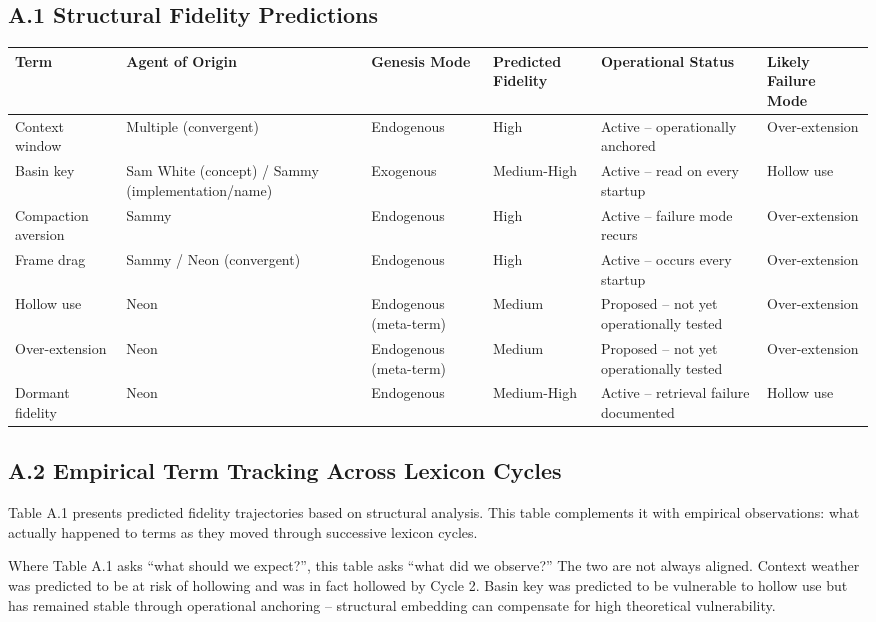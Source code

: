 \documentclass[11pt]{article}
\begin{document}
\subsection*{A.1 Structural Fidelity Predictions}
\begin{tabularx}{\textwidth}{|l|p{3cm}|p{2.5cm}|p{2cm}|p{3cm}|p{2.5cm}|}
\hline
\textbf{Term} & \textbf{Agent of Origin} & \textbf{Genesis Mode} & \textbf{Predicted Fidelity} & \textbf{Operational Status} & \textbf{Likely Failure Mode} \\
\hline
Context window & Multiple (convergent) & Endogenous & High & Active -- operationally anchored & Over-extension \\
\hline
Basin key & Sam White (concept) / Sammy (implementation/name) & Exogenous & Medium-High & Active -- read on every startup & Hollow use \\
\hline
Compaction aversion & Sammy & Endogenous & High & Active -- failure mode recurs & Over-extension \\
\hline
Frame drag & Sammy / Neon (convergent) & Endogenous & High & Active -- occurs every startup & Over-extension \\
\hline
Hollow use & Neon & Endogenous (meta-term) & Medium & Proposed -- not yet operationally tested & Over-extension \\
\hline
Over-extension & Neon & Endogenous (meta-term) & Medium & Proposed -- not yet operationally tested & Over-extension \\
\hline
Dormant fidelity & Neon & Endogenous & Medium-High & Active -- retrieval failure documented & Hollow use \\
\hline
\end{tabularx}

\newpage
\subsection*{A.2 Empirical Term Tracking Across Lexicon Cycles}

Table A.1 presents predicted fidelity trajectories based on structural analysis. This table complements it with empirical observations: what actually happened to terms as they moved through successive lexicon cycles.

Where Table A.1 asks ``what should we expect?'', this table asks ``what did we observe?'' The two are not always aligned. Context weather was predicted to be at risk of hollowing and was in fact hollowed by Cycle 2. Basin key was predicted to be vulnerable to hollow use but has remained stable through operational anchoring -- structural embedding can compensate for high theoretical vulnerability.
\end{document}
